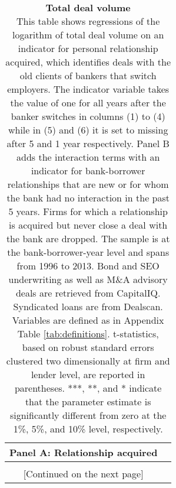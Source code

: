 \begin{table}[H] \begin{center} 
	\caption{\textbf{Total deal volume} \\ This table shows regressions of the logarithm of total deal volume on an indicator for personal relationship acquired, which identifies deals with the old clients of bankers that switch employers. The indicator variable takes the value of one for all years after the banker switches in columns (1) to (4) while in (5) and (6) it is set to missing after 5 and 1 year respectively. Panel B adds the interaction terms with an indicator for bank-borrower relationships that are new or for whom the bank had no interaction in the past 5 years. Firms for which a relationship is acquired but never close a deal with the bank are dropped. The sample is at the bank-borrower-year level and spans from 1996 to 2013. Bond and SEO underwriting as well as M\&A advisory deals are retrieved from CapitalIQ. Syndicated loans are from Dealscan. Variables are defined as in Appendix Table \ref{tab:definitions}. t-statistics, based on robust standard errors clustered two dimensionally at firm and lender level, are reported in parentheses. ***, **, and * indicate that the parameter estimate is significantly different from zero at the 1\%, 5\%, and 10\% level, respectively. }  
		\label{tab:main_dealsize} 
	\begin{threeparttable} 
	\begin{tabular*}{\hsize}{@{\hskip\tabcolsep\extracolsep\fill}l*{6}{c}}
	\multicolumn{6}{l}{\textbf{Panel A}: Relationship acquired} \\	\toprule  
	\def\sym#1{\ifmmode^{#1}\else\(^{#1}\)\fi}

				  
	\bottomrule \\  \multicolumn{6}{c}{[Continued on the next page]}  \end{tabular*}
	\end{threeparttable}   \end{center} \end{table}
\clearpage \newpage

